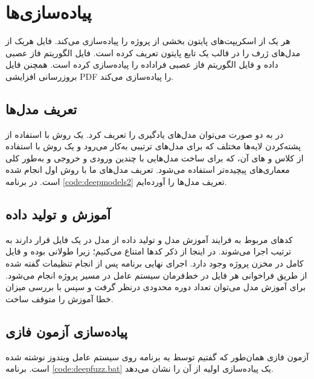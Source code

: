 \section{پیاده‌سازی‌ها}
هر یک از اسکریپت‌های پایتون بخشی از پروژه را پیاده‌سازی می‌کند. فایل 
هریک از مدل‌های ژرف را در قالب یک تابع پایتون تعریف کرده است. فایل 
الگوریتم فاز عصبی داده و فایل 
الگوریتم فاز عصبی فراداده را پیاده‌سازی کرده است. همچنن فایل 
بروزرسانی افزایشی \gls{PDF} را پیاده‌سازی می‌کند.


\subsection{تعریف مدل‌ها}
در 
به دو صورت می‌توان مدل‌های یادگیری را تعریف کرد. یک روش با استفاده از پشته‌کردن لایه‌ها مختلف که برای مدل‌های ترتیبی به‌کار می‌رود و یک روش با استفاده از کلاس  و های آن، که برای ساخت مدل‌هایی با چندین ورودی‌ و خروجی و به‌طور کلی معماری‌های پیچیده‌تر استفاده می‌شود. تعریف مدل‌های ما با روش اول انجام شده است. در برنامه \ref{code:deepmodels2} تعریف مدل‌ها را آورده‌ایم.

\begin{LTR}
\singlespacing
	
\doublespacing
\end{LTR}



\subsection{آموزش و تولید داده}
کدهای مربوط به فرایند آموزش مدل و تولید داده از مدل در یک فایل قرار دارند به ترتیب اجرا می‌شوند. در اینجا از ذکر کدها امتناع می‌کنیم؛ زیرا طولانی بوده و فایل کامل در مخزن پروژه وجود دارد. اجرای نهایی برنامه پس از انجام تنظیمات گفته شده از طریق فراخوانی هر فایل در خط‌فرمان سیستم عامل در مسیر پروژه انجام می‌شود. برای آموزش مدل می‌توان تعداد دوره محدودی درنظر گرفت و سپس با بررسی میزان خطا آموزش را متوقف ساخت. 


\subsection{پیاده‌سازی آزمون فازی}
آزمون فازی همان‌طور که گفتیم توسط یه برنامه  روی سیستم عامل ویندوز نوشته شده است. برنامه \ref{code:deepfuzz.bat} یک پیاده‌سازی اولیه از  آن را نشان می‌دهد.
\singlespacing
\begin{LTR}
	
\end{LTR}
\doublespacing


